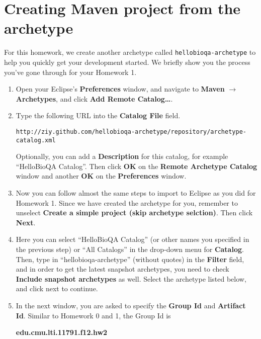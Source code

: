 
\section{Creating Maven project from the archetype}

For this homework, we create another archetype called
\texttt{hellobioqa-archetype} to help you quickly get your development started.
We briefly show you the process you've gone through for your Homework 1.

\begin{enumerate}

\item Open your Eclipse's \textbf{Preferences} window, and navigate to
\textbf{Maven} $\rightarrow$ \textbf{Archetypes}, and click \textbf{Add Remote
Catalog\ldots}.

\item Type the following URL into the \textbf{Catalog File} field.

\small
\begin{verbatim}
http://ziy.github.com/hellobioqa-archetype/repository/archetype-catalog.xml
\end{verbatim}
\normalsize

Optionally, you can add a \textbf{Description} for this catalog, for example
``HelloBioQA Catalog''. Then click \textbf{OK} on the \textbf{Remote Archetype
Catalog} window and another \textbf{OK} on the \textbf{Preferences} window.

\item Now you can follow almost the same steps to import to Eclipse as you did
for Homework 1. Since we have created the archetype for you, remember to
unselect \textbf{Create a simple project (skip archetype selction)}. Then click
\textbf{Next}.
 
\item Here you can select ``HelloBioQA Catalog'' (or other names you specified
in the previous step) or ``All Catalogs'' in the drop-down menu for
\textbf{Catalog}. Then, type in ``hellobioqa-archetype'' (without quotes) in the \textbf{Filter}
field, and in order to get the latest snapshot archetypes, you need to check
\textbf{Include snapshot archetypes} as well. Select the archetype listed below,
and click next to continue.

\item In the next window, you are asked to specify the \textbf{Group Id} and
\textbf{Artifact Id}. Similar to Homework 0 and 1, the Group Id is

\begin{center}
\textbf{edu.cmu.lti.11791.f12.hw2}
\end{center}


\end{enumerate}
